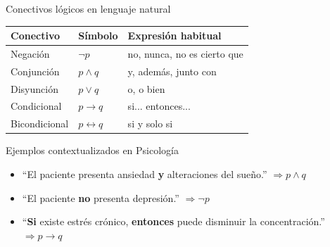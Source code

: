 \documentclass[aspectratio=169,10pt,handout]{beamer}
\newenvironment{Ejemplo}[1]
{
	\begin{exampleblock}{#1}
		\justifying
	}
	{
	\end{exampleblock}
}
\begin{document}
	\begin{frame}{Conectivos lógicos en lenguaje natural}
		\begin{center}
			\renewcommand{\arraystretch}{1.35}
			\begin{tabular}{>{\raggedright\arraybackslash}p{3.2cm} >{\centering\arraybackslash}p{1.7cm} >{\raggedright\arraybackslash}p{5.8cm}}
				\toprule
				\textbf{Conectivo} & \textbf{Símbolo} & \textbf{Expresión habitual} \\
				\midrule
				Negación & $\neg p$ & no, nunca, no es cierto que \\
				Conjunción & $p \land q$ & y, además, junto con \\
				Disyunción & $p \lor q$ & o, o bien \\
				Condicional & $p \to q$ & si... entonces... \\
				Bicondicional & $p \leftrightarrow q$ & si y solo si \\
				\bottomrule
			\end{tabular}
		\end{center}
		
		\pause
		
		\begin{Ejemplo}{Ejemplos contextualizados en Psicología}
			\begin{itemize}[leftmargin=*]
				\item ``El paciente presenta ansiedad \textbf{y} alteraciones del sueño.'' $\Rightarrow p \land q$
				\item ``El paciente \textbf{no} presenta depresión.'' $\Rightarrow \neg p$
				\item ``\textbf{Si} existe estrés crónico, \textbf{entonces} puede disminuir la concentración.'' $\Rightarrow p \to q$
			\end{itemize}
		\end{Ejemplo}
	\end{frame}
	
\end{document}
